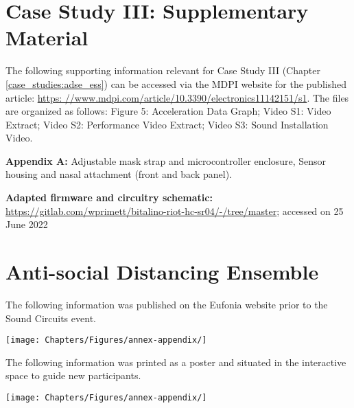 

\chapter{Case Study III: Supplementary Material}
\label{app:adse_materials}

The following supporting information relevant for Case Study III (Chapter \ref{case_studies:adse_ess}) can be accessed via the MDPI website for the published article: \url{https: //www.mdpi.com/article/10.3390/electronics11142151/s1}. The files are organized as follows: Figure 5: Acceleration Data Graph; Video S1: Video Extract; Video S2: Performance Video Extract; Video S3: Sound Installation Video.

\textbf{Appendix A:} Adjustable mask strap and microcontroller enclosure, Sensor housing and nasal attachment (front and back panel).

\textbf{Adapted firmware and circuitry schematic:} \url{https://gitlab.com/wprimett/bitalino-riot-hc-sr04/-/tree/master}; accessed on 25 June 2022

\chapter{Anti-social Distancing Ensemble}
\label{app:adse_installation}





The following information was published on the Eufonia website prior to the Sound Circuits event.

\texttt{[image: Chapters/Figures/annex-appendix/]}
\label{fig:adse_details}


The following information was printed as a poster and situated in the interactive space to guide new participants.

\texttt{[image: Chapters/Figures/annex-appendix/]}
\label{fig:asde_poster}


